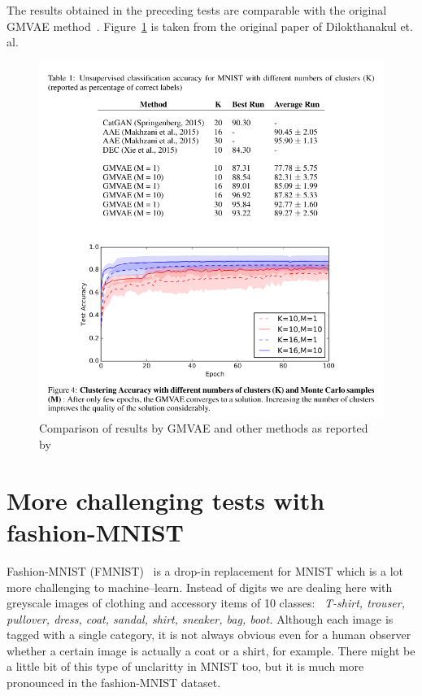 \documentclass[11pt, a4paper]{report}
\theoremstyle{plain}
\theoremstyle{definition}
\theoremstyle{remark}
\begin{document}
The results obtained in the preceding tests are comparable with the 
original GMVAE method~\cite{dilokthanakul2016deep}.
Figure~\ref{fig:mnist_comparisons} is taken from the original paper of Dilokthanakul et. al. 

\begin{figure}[h]
\centering
\includegraphics[width=1\textwidth]{images/mnist_comparisons.png}
\caption{Comparison of results by GMVAE and other
methods as reported by~\cite{dilokthanakul2016deep}}
\label{fig:mnist_comparisons}
\end{figure}

\chapter{More challenging tests with fashion-MNIST}
Fashion-MNIST (FMNIST)~\cite{fmnist} is a drop-in replacement for MNIST which
is a lot more challenging to machine--learn. Instead of digits we are dealing
here with greyscale images of clothing and accessory items of 10
classes:~
\emph{
T-shirt, trouser, pullover, dress, coat, sandal, shirt, sneaker, bag, boot.
}
Although each image is tagged with a single category, it is not always obvious
even for a human observer whether a certain image is actually a coat or a shirt,
for example. There might be a little bit of this type of unclaritty in MNIST
too, but it is much more pronounced in the fashion-MNIST dataset.
\end{document}
